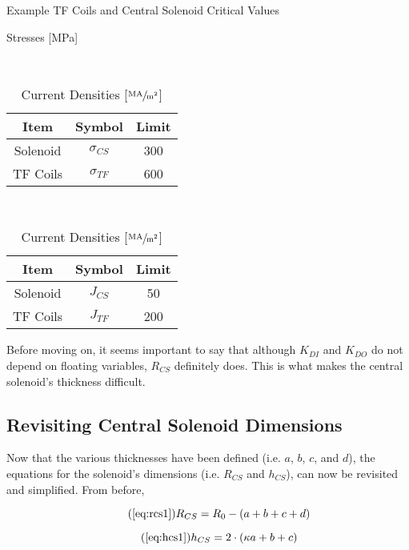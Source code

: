 \begin{table}[h!]
\centering	
\caption{Example TF Coils and Central Solenoid Critical Values}
\hfill
\begin{subtable}[t]{0.45\textwidth}
\centering	
\caption{Stresses [MPa]} ~\\
\begin{tabular}{ c|c|c } 

\textbf{Item} & \textbf{Symbol} & \textbf{Limit} \\
\hline
Solenoid & $\sigma_{CS}$ & 300 \\ 
TF Coils & $\sigma_{TF}$ & 600 \\ 
\end{tabular}
\end{subtable}
\hfill
\begin{subtable}[t]{0.45\textwidth}
\centering	
\caption{Current Densities [$\sfrac{\textnormal{MA}}{\textnormal{m}^2}$]} ~\\
\begin{tabular}{ c|c|c } 

\textbf{Item} & \textbf{Symbol} & \textbf{Limit} \\
\hline
Solenoid & $J_{CS}$ & 50 \\ 
TF Coils & $J_{TF}$ & 200 \\ 
\end{tabular}
\end{subtable}
\hfill
\hfill
\end{table}

Before moving on, it seems important to say that although $K_{DI}$ and $K_{DO}$ do not depend on floating variables, $R_{CS}$ definitely does. This is what makes the central solenoid's thickness difficult.

\subsection{Revisiting Central Solenoid Dimensions}

Now that the various thicknesses have been defined (i.e. $a$, $b$, $c$, and $d$), the equations for the solenoid's dimensions (i.e. $R_{CS}$ and $h_{CS}$), can now be revisited and simplified. From before,

 \begin{equation}
 	\tag{\ref{eq:rcs1}}
 	R_{CS} = R_0 - ( a + b + c + d )
 \end{equation}
 
 \begin{equation}
	\tag{\ref{eq:hcs1}}
 	h_{CS} = 2 \cdot \left ( \kappa a + b + c \right)
 \end{equation}

